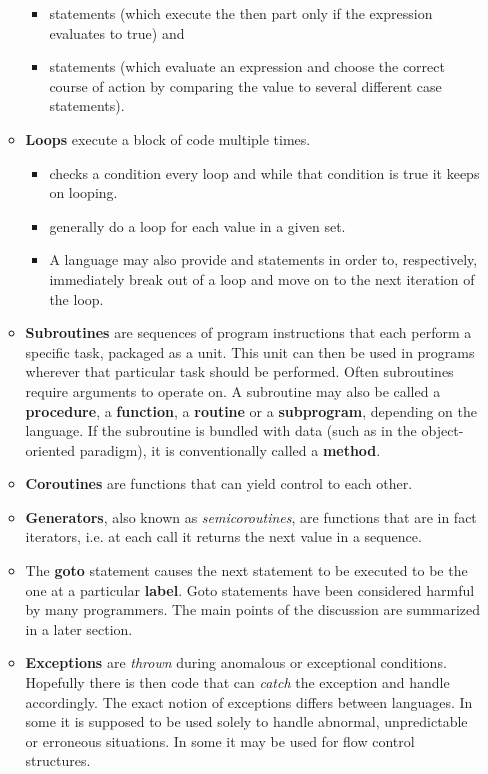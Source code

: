 \begin{itemize}
\begin{itemize}
\begin{itemize}
\item {} statements (which execute the then part only if the expression evaluates to true) and
\item {} statements (which evaluate an expression and choose the correct course of action by comparing the value to several different case statements).
\end{itemize}
\item \textbf{Loops} execute a block of code multiple times.
\begin{itemize}
\item {} checks a condition every loop and while that condition is true it keeps on looping.
\item {} generally do a loop for each value in a given set.
\item A language may also provide  and  statements in order to, respectively, immediately break out of a loop and move on to the next iteration of the loop.
\end{itemize}
\item \textbf{Subroutines} are sequences of program instructions that each perform a specific task, packaged as a unit. This unit can then be used in programs wherever that particular task should be performed. Often subroutines require arguments to operate on. A subroutine may also be called a \textbf{procedure}, a \textbf{function}, a \textbf{routine} or a \textbf{subprogram}, depending on the language. If the subroutine is bundled with data (such as in the object-oriented paradigm), it is conventionally called a \textbf{method}.
\item \textbf{Coroutines} are functions that can yield control to each other.
\item \textbf{Generators}, also known as \textit{semicoroutines}, are functions that are in fact iterators, i.e. at each call it returns the next value in a sequence.
\item The \textbf{goto} statement causes the next statement to be executed to be the one at a particular \textbf{label}. Goto statements have been considered harmful by many programmers. The main points of the discussion are summarized in a later section.
\item \textbf{Exceptions} are \textit{thrown} during anomalous or exceptional conditions. Hopefully there is then code that can \textit{catch} the exception and handle accordingly. The exact notion of exceptions differs between languages. In some it is supposed to be used solely to handle abnormal, unpredictable or erroneous situations. In some it may be used for flow control structures. 

\end{itemize}
\end{itemize}
